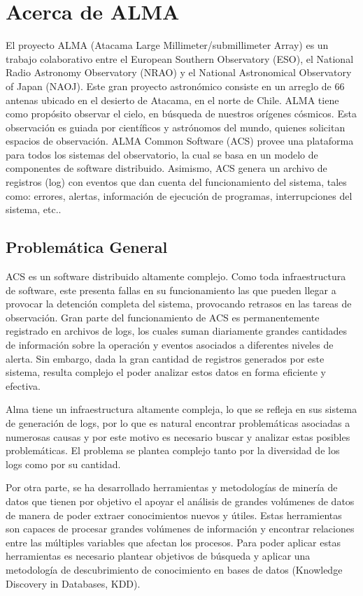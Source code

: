 \section{Acerca de  ALMA}
El proyecto ALMA (Atacama Large Millimeter/submillimeter Array) es un trabajo colaborativo entre el European Southern Observatory (ESO), el National Radio Astronomy Observatory (NRAO) y el National Astronomical Observatory of Japan (NAOJ). Este gran proyecto astronómico consiste en un arreglo de 66 antenas ubicado en el desierto de Atacama, en el norte de Chile.
ALMA tiene como propósito observar el cielo, en búsqueda de nuestros orígenes cósmicos. Esta observación es guiada por científicos y astrónomos del mundo, quienes solicitan espacios de observación.
ALMA Common Software (ACS) provee una plataforma para todos los sistemas del observatorio, la cual se basa en un modelo de componentes de software distribuido. Asimismo, ACS genera un archivo de registros (log) con eventos que dan cuenta del funcionamiento del sistema, tales como: errores, alertas, información de ejecución de programas, interrupciones del sistema, etc.\citep{ESO}.

\subsection{Problemática General}
ACS es un software distribuido altamente complejo. Como toda infraestructura de software, este presenta fallas en su funcionamiento las que pueden llegar a provocar la detención completa del sistema, provocando retrasos en las tareas de observación.
Gran parte del funcionamiento de ACS es permanentemente registrado en archivos de logs, los cuales suman diariamente grandes cantidades de información sobre la operación y eventos asociados a diferentes niveles de alerta. Sin embargo, dada la gran cantidad de registros generados por este sistema, resulta complejo el poder analizar estos datos en forma eficiente y efectiva.
 
Alma tiene un infraestructura altamente compleja, lo que se refleja en sus sistema de generación de logs, por lo que es natural encontrar problemáticas asociadas a numerosas causas y por este motivo es necesario buscar y analizar estas posibles problemáticas. El problema se plantea complejo tanto por la diversidad de los logs como por su cantidad.
 
Por otra parte, se ha desarrollado herramientas y metodologías de minería de datos que tienen por objetivo el apoyar el análisis de grandes volúmenes de datos de manera de poder extraer conocimientos nuevos y útiles. Estas herramientas son capaces de procesar grandes volúmenes de información y encontrar relaciones entre las múltiples variables que afectan los procesos. Para poder aplicar estas herramientas es necesario plantear objetivos de búsqueda y aplicar una metodología de descubrimiento de conocimiento en bases de datos (Knowledge Discovery in Databases, KDD).
 
